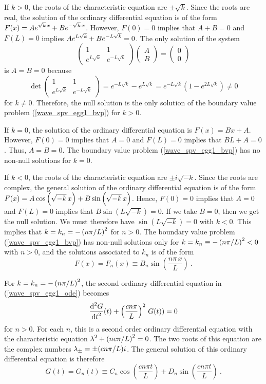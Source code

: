 \begin{egg}
If $k>0$, the roots of the characteristic equation are $\pm \sqrt{k}$.
Since the roots are real, the solution of the ordinary differential
equation is of the form
$\displaystyle F(x) = A e^{\sqrt{k}\,x} + B e^{-\sqrt{k}\, x}$.
However, $F(0)=0$ implies that $A + B=0$ and $F(L)=0$ implies
$\displaystyle A e^{L\sqrt{k}} + B e^{-L\sqrt{k}} = 0$.
The only solution of the system
\[
\begin{pmatrix}
1 & 1 \\ e^{L\sqrt{k}} & e^{-L\sqrt{k}}
\end{pmatrix}
\begin{pmatrix}
A \\ B
\end{pmatrix}
=
\begin{pmatrix}
0 \\ 0
\end{pmatrix}
\]
is $A=B=0$ because
\[
\det
\begin{pmatrix}
1 & 1 \\  e^{L\sqrt{k}} &  e^{-L\sqrt{k}}
\end{pmatrix}
= e^{-L\sqrt{k}} - e^{L\sqrt{k}} =
e^{-L\sqrt{k}}\left(1-e^{2L\sqrt{k}}\right) \neq 0
\]
for $k\neq 0$.  Therefore, the null solution is the only solution
of the boundary value problem (\ref{wave_spv_egg1_bvp}) for $k>0$.

If $k=0$, the solution of the ordinary differential equation is
$F(x)=B x+ A$.  However, $F(0)=0$ implies that $A=0$ and $F(L)=0$
implies that $B L + A = 0$.  Thus, $A = B =0$.  The boundary value problem
(\ref{wave_spv_egg1_bvp}) has no non-null solutions for $k =0$.

If $k<0$, the roots of the characteristic equation are $\pm i \sqrt{-k}$.
Since the roots are complex, the general solution of the ordinary
differential equation is of the form $\displaystyle
F(x) = A \cos\left(\sqrt{-k}\,x\right) + B \sin\left(\sqrt{-k}\,x\right)$.
Hence, $F(0)=0$ implies that $A =0$ and $F(L)=0$ implies that
$B \sin\left(L\sqrt{-k}\right) = 0$.  If we take $B=0$, then we get the
null solution.  We must therefore have
$\sin\left(L\sqrt{-k}\right) = 0$ with $k< 0$.  This implies
that $\displaystyle k = k_n = -\left(n\pi/L\right)^2$ for $n>0$.  The
boundary value problem (\ref{wave_spv_egg1_bvp}) has non-null solutions only for
$\displaystyle k=k_n\equiv -\left(n\pi/L\right)^2<0$ with $n>0$, and
the solutions associated to $k_n$ is of the form
\[
F(x)=F_n(x) \equiv B_n \sin\left(\frac{n\pi\,x}{L}\right) \ .
\]

For $\displaystyle k= k_n=-\left(n\pi/L\right)^2$, the second ordinary
differential equation in (\ref{wave_spv_egg1_ode}) becomes
\[
\frac{\displaystyle \mathrm{d}^{2}{G}} {\displaystyle \mathrm{d}{t}^{2}}(t) + \left(\frac{c n\pi}{L}\right)^2\,G(t)) = 0
\]
for $n>0$.  For each $n$, this is a second order ordinary differential
equation with the characteristic equation
$\displaystyle \lambda^2 +\left(n c\pi/L\right)^2=0$.  The two
roots of this equation are the complex numbers
$\displaystyle \lambda_{\pm} = \pm (c n\pi/L)i$.
The general solution of this ordinary differential equation is therefore
\[
G(t) = G_n(t) \equiv C_n \cos\left(\frac{cn\pi t}{L}\right)
+ D_n \sin\left(\frac{cn\pi t}{L}\right) \  .
\]


\end{egg}
